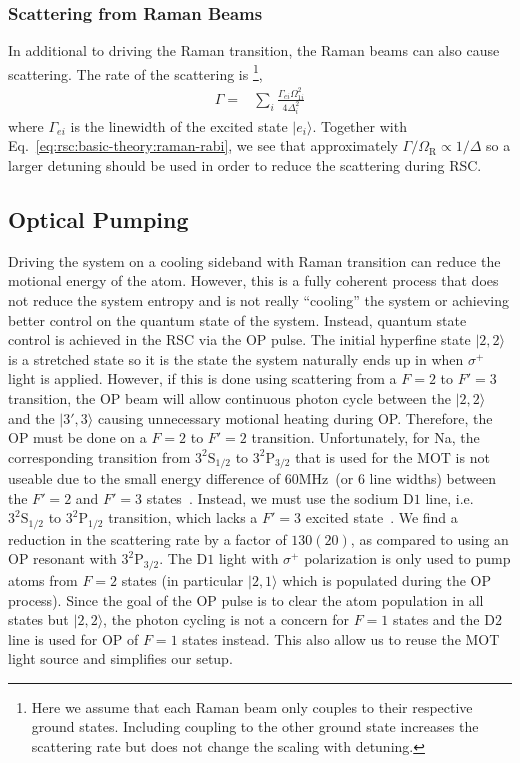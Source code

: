 \subsubsection{Scattering from Raman Beams}
\label{ch:rsc:basic-theory:raman-scatter}

In additional to driving the Raman transition, the Raman beams can also cause scattering.
The rate of the scattering is
\footnote{Here we assume that each Raman beam only couples to their respective ground states.
  Including coupling to the other ground state increases the scattering rate but does not change
  the scaling with detuning.},
\begin{align*}
  \Gamma=&\sum_{i}\frac{\Gamma_{ei}\Omega_{1i}^2}{4\Delta_i^2}
\end{align*}
where $\Gamma_{ei}$ is the linewidth of the excited state $|e_i\rangle$.
Together with Eq.~\ref{eq:rsc:basic-theory:raman-rabi}, we see that approximately
$\Gamma/\Omega_{\mathrm{R}}\propto1/\Delta$ so a larger detuning should be used
in order to reduce the scattering during RSC.

\subsection{Optical Pumping}
\label{ch:rsc:basic-theory:op}

Driving the system on a cooling sideband with Raman transition can reduce the
motional energy of the atom. However, this is a fully coherent process that does
not reduce the system entropy and is not really ``cooling'' the system
or achieving better control on the quantum state of the system.
Instead, quantum state control is achieved in the RSC via the OP pulse.
The initial hyperfine state $|2,2\rangle$ is a stretched state so it is the
state the system naturally ends up in when $\sigma^+$ light is applied.
However, if this is done using scattering from a $F=2$ to $F'=3$ transition,
the OP beam will allow continuous photon cycle
between the $|2,2\rangle$ and the $|3',3\rangle$ causing unnecessary motional heating during OP.
Therefore, the OP must be done on a $F=2$ to $F'=2$ transition.
Unfortunately, for Na, the corresponding transition
from $\mathrm{3^2S_{1/2}}$ to $\mathrm{3^2P_{3/2}}$
that is used for the MOT is not useable due to the small energy difference of
$60 \mathrm{MHz}$~(or $6$ line widths) between the $F'=2$ and
$F'=3$ states~\cite{steck_sodium_2019}.
Instead, we must use the sodium $\mathrm{D1}$ line,
i.e. $\mathrm{3^2S_{1/2}}$ to $\mathrm{3^2P_{1/2}}$ transition,
which lacks a $F'=3$ excited state~\cite{monroe_resolved-sideband_1995,grobner_degenerate_2017}.
We find a reduction in the scattering rate by a factor of $130(20)$,
as compared to using an OP resonant with $\mathrm{3^2P_{3/2}}$.
The $\mathrm{D1}$ light with $\sigma^+$ polarization is only used to pump atoms from
$F=2$ states (in particular $|2,1\rangle$ which is populated during the OP process).
Since the goal of the OP pulse is to clear the atom population in all states but $|2,2\rangle$,
the photon cycling is not a concern for $F=1$ states and the $\mathrm{D2}$ line
is used for OP of $F=1$ states instead.
This also allow us to reuse the MOT light source and simplifies our setup.

